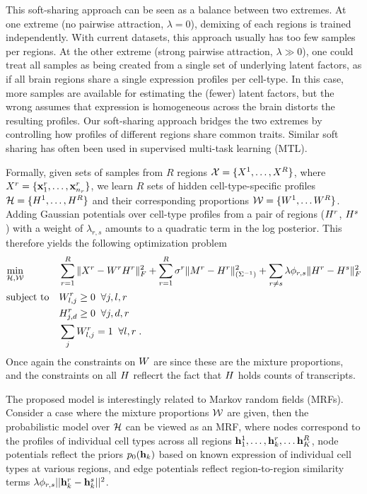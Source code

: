 This soft-sharing approach can be seen as a balance between two extremes. At one extreme (no pairwise attraction, $\lambda=0$), demixing of each regions is trained independently. With current datasets, this approach usually has too few samples per regions.  At the other extreme (strong pairwise attraction, $\lambda \gg 0$), one could treat all samples as being created from a single set of underlying latent factors, as if all brain regions share a single expression profiles per cell-type. In this case, more samples are available for estimating the (fewer) latent factors, but the wrong assumes that expression is homogeneous across the brain   distorts the resulting profiles. Our soft-sharing approach bridges the two extremes by controlling how profiles of different regions share common traits. Similar soft sharing has often been used in supervised multi-task learning (MTL). 

Formally, given sets of samples from $R$ regions ${\cal{X}} = \{X^1,\ldots, X^R\}$, where $X^r = \{\mathbf{x}^r_1, \ldots, \mathbf{x}^r_{n_r} \}$, we learn $R$ sets of hidden cell-type-specific profiles ${\cal{{H}}} = \{{H}^1,\ldots, {H}^R\}$ and their corresponding proportions ${\cal{W}} = \{ W^1,\ldots W^R\}$. Adding Gaussian potentials over cell-type profiles from a pair of regions (${H}^r$, ${H}^s$) with a weight of $\lambda_{r,s}$ amounts to a quadratic term in the log posterior. This therefore yields the following optimization problem
\begin{equation}
    \label{eq-multi}
    \begin{aligned}
        & \underset{\cal{{H}},\cal{W}}{\text{min}}  
        & & \sum_{r=1}^R  \| X^r - W^r {H}^r \|_F^2
        + \sum_{r=1}^R  \sigma^r \| M^r - {H}^r \|^2_{(\Sigma^{-1})}  
        + \sum_{r \neq s} \lambda \phi_{r , s} \| {H}^r - {H}^s \|_F^2  \\
        & \text{subject to} &
            & W^r_{l,j} \geq 0 \;\; \forall j, l, r\\
        & & & H^r_{j,d} \geq 0 \;\;\forall j, d, r \\
        & & & \sum_j W^r_{l,j} = 1 \;\; \forall l,r \;. 
    \end{aligned}
\end{equation}
Once again the constraints on $W$ are since these are the mixture proportions, and the constraints on all ${H}$ reflecrt the fact that ${H}$ holds counts of transcripts.

The proposed model is interestingly related to Markov random fields (MRFs). Consider a case where the mixture proportions $\cal{W}$ are given, then the probabilistic model over $\cal{{H}}$ can be viewed as an MRF, where nodes correspond to the profiles of individual cell types across all regions $\mathbf{h}^1_1,\ldots, \mathbf{h}^r_k, \ldots \mathbf{h}^R_K$, node potentials reflect the priors $p_0(\mathbf{h}_k)$ based on known expression of individual cell types at various regions, and edge potentials reflect region-to-region similarity terms $\lambda \phi_{r,s}|| \mathbf{h}^r_k - \mathbf{h}^s_k||^2$. 

